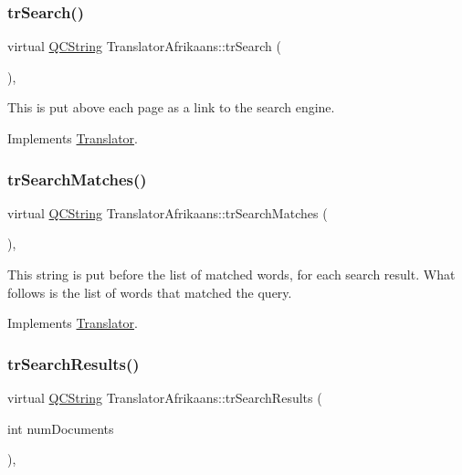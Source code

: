 \subsubsection{\texorpdfstring{trSearch()}{trSearch()}}
{\footnotesize\ttfamily virtual \mbox{\hyperlink{class_q_c_string}{Q\+C\+String}} Translator\+Afrikaans\+::tr\+Search (\begin{DoxyParamCaption}{ }\end{DoxyParamCaption})\hspace{0.3cm}{\ttfamily [inline]}, {\ttfamily [virtual]}}

This is put above each page as a link to the search engine. 

Implements \mbox{\hyperlink{class_translator}{Translator}}.

\mbox{\label{class_translator_afrikaans_a98f13b9d13f68d213cd55b820da1412c}} 
\subsubsection{\texorpdfstring{trSearchMatches()}{trSearchMatches()}}
{\footnotesize\ttfamily virtual \mbox{\hyperlink{class_q_c_string}{Q\+C\+String}} Translator\+Afrikaans\+::tr\+Search\+Matches (\begin{DoxyParamCaption}{ }\end{DoxyParamCaption})\hspace{0.3cm}{\ttfamily [inline]}, {\ttfamily [virtual]}}

This string is put before the list of matched words, for each search result. What follows is the list of words that matched the query. 

Implements \mbox{\hyperlink{class_translator}{Translator}}.

\mbox{\label{class_translator_afrikaans_a5c4a225154624cfcc4091dd56bc40106}} 
\subsubsection{\texorpdfstring{trSearchResults()}{trSearchResults()}}
{\footnotesize\ttfamily virtual \mbox{\hyperlink{class_q_c_string}{Q\+C\+String}} Translator\+Afrikaans\+::tr\+Search\+Results (\begin{DoxyParamCaption}\item[{int}]{num\+Documents }\end{DoxyParamCaption})\hspace{0.3cm}{\ttfamily [inline]}, {\ttfamily [virtual]}}

